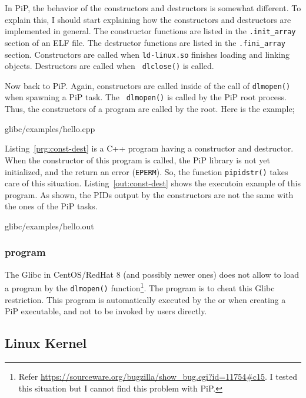 In PiP, the behavior of the constructors and destructors is
somewhat different. To explain this, I should start explaining how the
constructors and destructors are implemented in general. The
constructor functions are listed in the {\tt .init_array} section of an ELF
file. The destructor functions are listed in the {\tt .fini_array}
section. Constructors are called when {\tt ld-linux.so} finishes
loading and linking objects. Destructors are called when {\tt
  dlclose()} is called.

Now back to PiP. Again, constructors are called inside
of the call of {\tt dlmopen()} when spawning a PiP task. The {\tt
  dlmopen()} is called by the PiP root process. Thus, the constructors
of a program are called by the root. Here is the example;

 {glibc/examples/hello.cpp}

Listing~\ref{prg:const-dest} is a C++ program having a constructor and
destructor. When the constructor of this program is called, the PiP
library is not yet initialized, and the 
return an error ({\tt EPERM}). So, the function {\tt pipidstr()} takes
care of this situation. Listing~\ref{out:const-dest} shows the
executoin example of this program. As shown, the PIDs output by the
constructors are not the same with the ones of the PiP tasks. 

 {glibc/examples/hello.out}

\subsubsection{ program}

The Glibc in CentOS/RedHat 8 (and possibly newer ones) does not allow
to load a program by the {\tt dlmopen()} function\footnote{Refer
\url{https://sourceware.org/bugzilla/show_bug.cgi?id=11754\#c15}. I
tested this situation but I cannot find this problem with PiP.}. The
 program is to cheat this Glibc restriction. This
program is automatically executed by the  or
 when creating a PiP executable, and not to be invoked
by users directly.


\subsection{Linux Kernel}\label{sec:linux}


